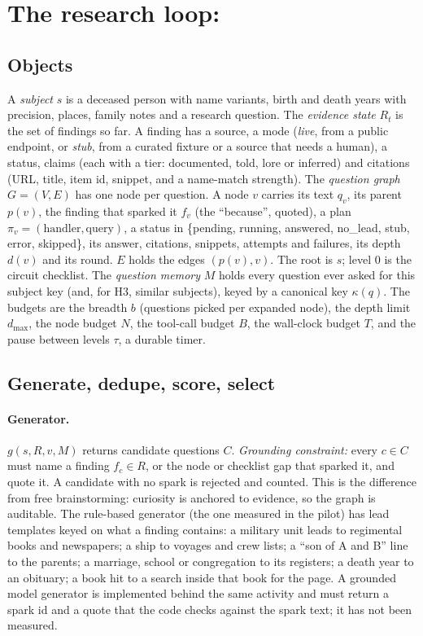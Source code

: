 \section{The research loop: \CR}
\label{sec:loop}

\subsection{Objects}
A \emph{subject} $s$ is a deceased person with name variants, birth and death years with precision, places, family notes and a research question. The \emph{evidence state} $R_t$ is the set of findings so far. A finding has a source, a mode (\emph{live}, from a public endpoint, or \emph{stub}, from a curated fixture or a source that needs a human), a status, claims (each with a tier: documented, told, lore or inferred) and citations (URL, title, item id, snippet, and a name-match strength). The \emph{question graph} $G=(V,E)$ has one node per question. A node $v$ carries its text $q_v$, its parent $p(v)$, the finding that sparked it $f_v$ (the ``because'', quoted), a plan $\pi_v=(\text{handler},\text{query})$, a status in \{pending, running, answered, no\_lead, stub, error, skipped\}, its answer, citations, snippets, attempts and failures, its depth $d(v)$ and its round. $E$ holds the edges $(p(v),v)$. The root is $s$; level 0 is the circuit checklist. The \emph{question memory} $M$ holds every question ever asked for this subject key (and, for H3, similar subjects), keyed by a canonical key $\kappa(q)$. The budgets are the breadth $b$ (questions picked per expanded node), the depth limit $d_{\max}$, the node budget $N$, the tool-call budget $B$, the wall-clock budget $T$, and the pause between levels $\tau$, a durable timer.

\subsection{Generate, dedupe, score, select}
\paragraph{Generator.} $g(s,R,v,M)$ returns candidate questions $C$. \emph{Grounding constraint:} every $c\in C$ must name a finding $f_c\in R$, or the node or checklist gap that sparked it, and quote it. A candidate with no spark is rejected and counted. This is the difference from free brainstorming: curiosity is anchored to evidence, so the graph is auditable. The rule-based generator (the one measured in the pilot) has lead templates keyed on what a finding contains: a military unit leads to regimental books and newspapers; a ship to voyages and crew lists; a ``son of A and B'' line to the parents; a marriage, school or congregation to its registers; a death year to an obituary; a book hit to a search inside that book for the page. A grounded model generator is implemented behind the same activity and must return a spark id and a quote that the code checks against the spark text; it has not been measured.

